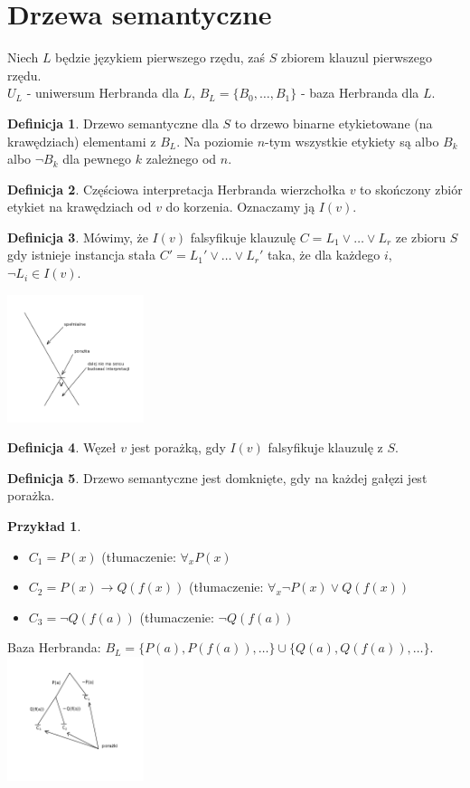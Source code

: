 \documentclass[10pt,a4paper]{article}
\theoremstyle{plain}
\theoremstyle{definition}
\newtheorem*{definition}{Definicja}
\newtheorem*{example}{Przykład}
\begin{document}
\section{Drzewa semantyczne}
Niech $L$ będzie językiem pierwszego rzędu, zaś $S$ zbiorem klauzul pierwszego rzędu.\\
$U_L$ - uniwersum Herbranda dla $L$, $B_L = \{B_0,\ldots,B_1\}$ - baza Herbranda dla $L$.
\begin{definition}
Drzewo semantyczne dla $S$ to drzewo binarne etykietowane (na krawędziach) elementami z $B_L$.
Na poziomie $n$-tym wszystkie etykiety są albo $B_k$ albo $\lnot B_k$ dla pewnego $k$ zależnego od $n$.
\end{definition}
\begin{definition}
Częściowa interpretacja Herbranda wierzchołka $v$ to skończony zbiór etykiet na krawędziach od $v$ do korzenia.
Oznaczamy ją $I(v)$.
\end{definition}
\begin{definition}
Mówimy, że $I(v)$ falsyfikuje klauzulę $C = L_1 \vee \ldots \vee L_r$ ze zbioru $S$ gdy istnieje instancja stała $C' = L_1' \vee \ldots \vee L_r'$
taka, że dla każdego $i$, $\lnot L_i \in I(v)$.
\end{definition}
\centering \includegraphics[width=0.3\textwidth]{img/drzewosemantyczne}
\begin{definition}
Węzeł $v$ jest porażką, gdy $I(v)$ falsyfikuje klauzulę z $S$.
\end{definition}
\begin{definition}
Drzewo semantyczne jest domknięte, gdy na każdej gałęzi jest porażka.
\end{definition}
\begin{example}
\begin{itemize}
Niech $S$ składa się z klauzul:
 \item $C_1 = P(x)$ (tłumaczenie: $\forall_x P(x)$
 \item $C_2 = P(x) \to Q(f(x))$ (tłumaczenie: $\forall_x \lnot P(x) \vee Q(f(x))$
 \item $C_3 = \lnot Q(f(a))$ (tłumaczenie: $\lnot Q(f(a))$
\end{itemize}
Baza Herbranda: $B_L = \{P(a), P(f(a)), \ldots\} \cup \{Q(a), Q(f(a)), \ldots\}$.\\
\centering \includegraphics[width=0.3\textwidth]{img/drzewosemantyczne2}
\end{example}
\end{document}
